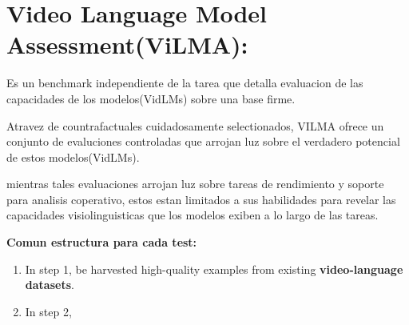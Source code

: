 \section{Video Language Model Assessment(ViLMA):}

Es un benchmark independiente de la tarea que detalla evaluacion de las capacidades de los modelos(VidLMs) sobre una base firme.

Atravez de countrafactuales cuidadosamente selectionados, VILMA ofrece un conjunto de evaluciones controladas que arrojan luz sobre el verdadero potencial de estos modelos(VidLMs).

mientras tales evaluaciones arrojan luz sobre tareas de rendimiento y soporte para analisis coperativo, estos estan limitados a sus habilidades para revelar las capacidades visiolinguisticas que los modelos exiben a lo largo de las tareas.

\textbf{Comun estructura para cada test:}
\begin{enumerate}
\item In step 1, be harvested high-quality examples from existing \textbf{video-language datasets}.
\item In step 2, 
\end{enumerate}
